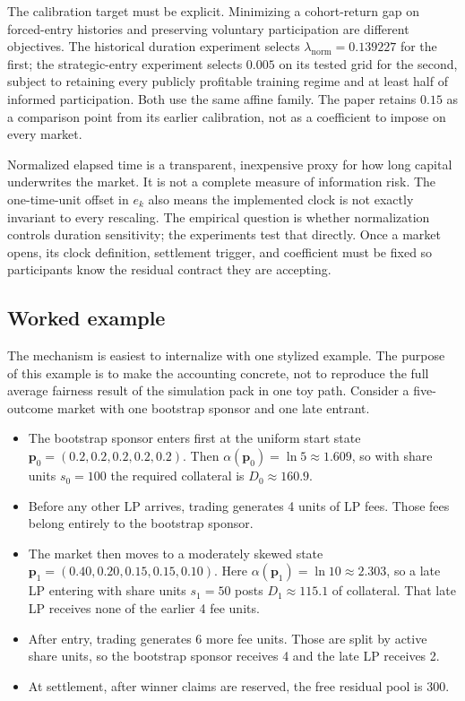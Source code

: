 \documentclass[10pt]{article}
\begin{document}
The calibration target must be explicit. Minimizing a cohort-return gap on forced-entry histories and preserving voluntary participation are different objectives. The historical duration experiment selects $\lambda_{\mathrm{norm}}=0.139227$ for the first; the strategic-entry experiment selects $0.005$ on its tested grid for the second, subject to retaining every publicly profitable training regime and at least half of informed participation. Both use the same affine family. The paper retains $0.15$ as a comparison point from its earlier calibration, not as a coefficient to impose on every market.

Normalized elapsed time is a transparent, inexpensive proxy for how long capital underwrites the market. It is not a complete measure of information risk. The one-time-unit offset in $e_k$ also means the implemented clock is not exactly invariant to every rescaling. The empirical question is whether normalization controls duration sensitivity; the experiments test that directly. Once a market opens, its clock definition, settlement trigger, and coefficient must be fixed so participants know the residual contract they are accepting.

\subsection{Worked example}

The mechanism is easiest to internalize with one stylized example. The purpose of this example is to make the accounting concrete, not to reproduce the full average fairness result of the simulation pack in one toy path. Consider a five-outcome market with one bootstrap sponsor and one late entrant.

\begin{itemize}
\item The bootstrap sponsor enters first at the uniform start state $\mathbf{p}_0=(0.2,0.2,0.2,0.2,0.2)$. Then $\alpha(\mathbf{p}_0)=\ln 5 \approx 1.609$, so with share units $s_0 = 100$ the required collateral is $D_0 \approx 160.9$.
\item Before any other LP arrives, trading generates 4 units of LP fees. Those fees belong entirely to the bootstrap sponsor.
\item The market then moves to a moderately skewed state $\mathbf{p}_1=(0.40,0.20,0.15,0.15,0.10)$. Here $\alpha(\mathbf{p}_1)=\ln 10 \approx 2.303$, so a late LP entering with share units $s_1 = 50$ posts $D_1 \approx 115.1$ of collateral. That late LP receives none of the earlier 4 fee units.
\item After entry, trading generates 6 more fee units. Those are split by active share units, so the bootstrap sponsor receives 4 and the late LP receives 2.
\item At settlement, after winner claims are reserved, the free residual pool is 300.
\end{itemize}
\end{document}
